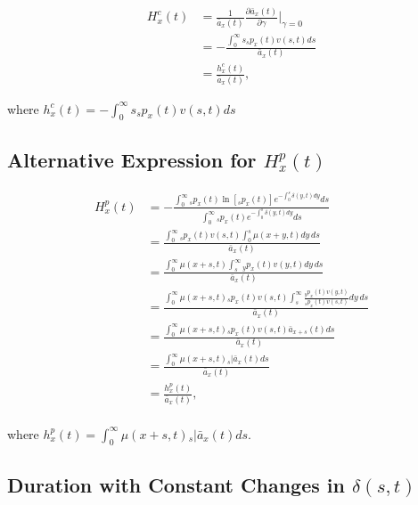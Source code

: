 \documentclass[12pt]{article}
\begin{document}
\begin{equation}\label{eq:EntropyConst3}
\begin{split}
{H}^{c}_x(t)&=\frac{1}{\bar{a}_x(t)}\frac{\partial \bar{a}_x(t)}{\partial \gamma} \bigg\rvert_{\gamma=0}\\
&= -\frac{\int_0^\infty s {}_sp_x(t) {v}(s,t)ds}{\bar{a}_x(t)} \\
&= \frac{{h}^{c}_x(t)}{\bar{a}_x(t)},
\end{split}
\end{equation}

where ${h}^{c}_x(t)=-\int_0^\infty s {}_sp_x(t) {v}(s,t)ds$



\subsection{Alternative Expression for ${H}^{p}_{x}(t)$}\label{sec:EntropyAlt}

\begin{equation} \label{eq:EntropyAnnuityA1}
\begin{split}
{H}^{p}_{x}(t) &= -\frac{ \int_{0}^{\infty}{}_sp_x(t)\ln[{}_sp_x(t)] e^{-\int_{0}^{s}\delta(y,t)dy} ds}{\int_0^\infty {}_sp_x(t) e^{-\int_{0}^{s}\delta(y,t)dy} ds}\\
&= \frac{\int_0^\infty {}_sp_x(t) {v}(s,t) \int_0^s \mu(x+y,t) dy\,ds}{\bar{a}_x(t)}\\
&= \frac{\int_0^\infty  \mu(x+s,t) \int_s^\infty {}_yp_x(t) {v}(y,t)  dy\,ds}{\bar{a}_x(t)}\\
&= \frac{\int_0^\infty  \mu(x+s,t)  {}_sp_x(t) {v}(s,t) \int_s^\infty \frac{ {}_yp_x(t) {v}(y,t)}{ {}_sp_x(t) {v}(s,t)}  dy\,ds}{\bar{a}_x(t)}\\
&=  \frac{\int_0^\infty \mu(x+s,t)   {}_sp_x(t) {v}(s,t) \bar{a}_{x+s}(t) ds}{\bar{a}_x(t)} \\
&=  \frac{\int_0^\infty \mu(x+s,t)  {}_s|\bar{a}_x(t) ds}{\bar{a}_x(t)} \\
&=  \frac{{h}^{p}_{x}(t)}{\bar{a}_x(t)}, \\
\end{split}
\end{equation}

where ${h}^{p}_{x}(t)=\int_0^\infty \mu(x+s,t)   {}_s|\bar{a}_x(t) ds$.



\subsection{Duration with Constant Changes in $\delta(s,t)$}\label{sec:DurConst}
\end{document}
